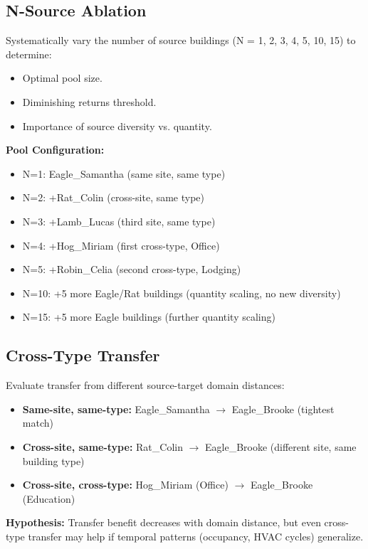\documentclass[12pt,a4paper]{report}
\begin{document}
\subsection{N-Source Ablation}

Systematically vary the number of source buildings (N = 1, 2, 3, 4, 5, 10, 15) to determine:

\begin{itemize}
    \item Optimal pool size.
    \item Diminishing returns threshold.
    \item Importance of source diversity vs. quantity.
\end{itemize}

\textbf{Pool Configuration:}
\begin{itemize}
    \item N=1: Eagle\_Samantha (same site, same type)
    \item N=2: +Rat\_Colin (cross-site, same type)
    \item N=3: +Lamb\_Lucas (third site, same type)
    \item N=4: +Hog\_Miriam (first cross-type, Office)
    \item N=5: +Robin\_Celia (second cross-type, Lodging)
    \item N=10: +5 more Eagle/Rat buildings (quantity scaling, no new diversity)
    \item N=15: +5 more Eagle buildings (further quantity scaling)
\end{itemize}

\subsection{Cross-Type Transfer}

Evaluate transfer from different source-target domain distances:

\begin{itemize}
    \item \textbf{Same-site, same-type:} Eagle\_Samantha $\to$ Eagle\_Brooke (tightest match)
    \item \textbf{Cross-site, same-type:} Rat\_Colin $\to$ Eagle\_Brooke (different site, same building type)
    \item \textbf{Cross-site, cross-type:} Hog\_Miriam (Office) $\to$ Eagle\_Brooke (Education)
\end{itemize}

\textbf{Hypothesis:} Transfer benefit decreases with domain distance, but even cross-type transfer may help if temporal patterns (occupancy, HVAC cycles) generalize.
\end{document}
